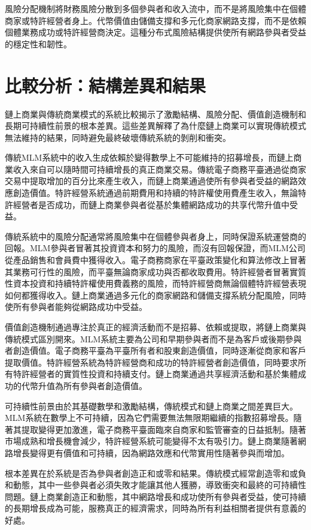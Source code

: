 \documentclass[
  Letterpaper,
]{scrbook}
\begin{document}
風險分配機制將財務風險分散到多個參與者和收入流中，而不是將風險集中在個體商家或特許經營者身上。代幣價值由儲備支撐和多元化商家網路支撐，而不是依賴個體業務成功或特許經營商決定。這種分布式風險結構提供使所有網路參與者受益的穩定性和韌性。

\section{比較分析：結構差異和結果}\label{ux6bd4ux8f03ux5206ux6790ux7d50ux69cbux5deeux7570ux548cux7d50ux679c}

鏈上商業與傳統商業模式的系統比較揭示了激勵結構、風險分配、價值創造機制和長期可持續性前景的根本差異。這些差異解釋了為什麼鏈上商業可以實現傳統模式無法維持的結果，同時避免最終破壞傳統系統的剝削和衝突。

傳統MLM系統中的收入生成依賴於變得數學上不可能維持的招募增長，而鏈上商業收入來自可以隨時間可持續增長的真正商業交易。傳統電子商務平臺通過從商家交易中提取增加的百分比來產生收入，而鏈上商業通過使所有參與者受益的網路效應創造價值。特許經營系統通過前期費用和持續的特許權使用費產生收入，無論特許經營者是否成功，而鏈上商業參與者從基於集體網路成功的共享代幣升值中受益。

傳統系統中的風險分配通常將風險集中在個體參與者身上，同時保證系統運營商的回報。MLM參與者冒著其投資資本和努力的風險，而沒有回報保證，而MLM公司從產品銷售和會員費中獲得收入。電子商務商家在平臺政策變化和算法修改上冒著其業務可行性的風險，而平臺無論商家成功與否都收取費用。特許經營者冒著實質性資本投資和持續特許權使用費義務的風險，而特許經營商無論個體特許經營表現如何都獲得收入。鏈上商業通過多元化的商家網路和儲備支撐系統分配風險，同時使所有參與者能夠從網路成功中受益。

價值創造機制通過專注於真正的經濟活動而不是招募、依賴或提取，將鏈上商業與傳統模式區別開來。MLM系統主要為公司和早期參與者而不是為客戶或後期參與者創造價值。電子商務平臺為平臺所有者和股東創造價值，同時逐漸從商家和客戶提取價值。特許經營系統為特許經營商和成功的特許經營者創造價值，同時要求所有特許經營者的實質性投資和持續支付。鏈上商業通過共享經濟活動和基於集體成功的代幣升值為所有參與者創造價值。

可持續性前景由於其基礎數學和激勵結構，傳統模式和鏈上商業之間差異巨大。MLM系統在數學上不可持續，因為它們需要無法無限期繼續的指數招募增長。隨著其提取變得更加激進，電子商務平臺面臨來自商家和監管審查的日益抵制。隨著市場成熟和增長機會減少，特許經營系統可能變得不太有吸引力。鏈上商業隨著網路增長變得更有價值和可持續，因為網路效應和代幣實用性隨著參與而增加。

根本差異在於系統是否為參與者創造正和或零和結果。傳統模式經常創造零和或負和動態，其中一些參與者必須失敗才能讓其他人獲勝，導致衝突和最終的可持續性問題。鏈上商業創造正和動態，其中網路增長和成功使所有參與者受益，使可持續的長期增長成為可能，服務真正的經濟需求，同時為所有利益相關者提供有意義的好處。
\end{document}
